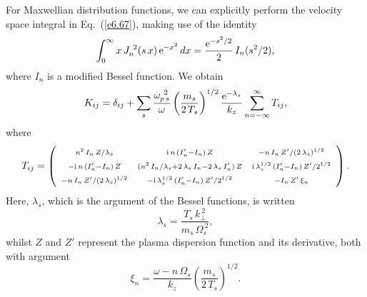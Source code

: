 For Maxwellian distribution functions, we can explicitly perform the velocity
space integral in Eq.~(\ref{e6.67}), making use of the identity
\begin{equation}
\int_0^\infty x\,J_n^{~2}(s\,x)\,{\rm e}^{-x^2}\,dx= \frac{{\rm e}^{-s^2/2}}{2}
\,I_n(s^2/2),
\end{equation}
where $I_n$ is a modified Bessel function. We obtain
\begin{equation}
K_{ij} = \delta_{ij} + \sum_s\frac{\omega_{p\,s}^{~2}}{\omega}
\left(\frac{m_s}{2\,T_s}\right)^{1/2} \frac{{\rm e}^{-\lambda_s}}{k_z}
\sum_{n=-\infty}^\infty T_{ij},
\end{equation}
where
\begin{equation}\label{e6.72}
T_{ij} = \left( \begin{array}{ccc}
{\scriptstyle n^2\,I_n\,Z/\lambda_s} & {\scriptstyle {\rm i}\,n\,(I_n'-I_n)\,Z} &
{\scriptstyle  -n\,I_n\,Z'/(2\,\lambda_s)^{1/2}}
\\[0.5ex]
{\scriptstyle -{\rm i}\,n\,(I_n'-I_n)\,Z} & {\scriptstyle (n^2\,I_n/\lambda_s +2\,\lambda_s\,I_n -2\,\lambda_s\,
I_n')\,Z} & {\scriptstyle {\rm i}\,\lambda_s^{1/2}\,(I_n'-I_n)\,Z'/2^{1/2}} \\[0.5ex]
{\scriptstyle -n\,I_n\,Z'/(2\,\lambda_s)^{1/2}} &{\scriptstyle
 -{\rm i}\,\lambda_s^{1/2}\,(I_n'-I_n)\,Z'/2^{1/2}}
&{\scriptstyle  -I_n\,Z'\,\xi_n}
\end{array}
\right).
\end{equation}
Here, $\lambda_s$, which is the argument of the Bessel functions, is written
\begin{equation}\label{e6.73}
\lambda_s = \frac{T_s\,k_\perp^{~2}}{m_s\,{\Omega}_s^{~2}},
\end{equation}
whilst $Z$ and $Z'$ represent the plasma dispersion function and its derivative,
both with argument
\begin{equation}\label{e6.74}
\xi_n = \frac{\omega - n\,{\Omega}_s}{k_z} \left(\frac{m_s}{2\,T_s}\right)^{1/2}.
\end{equation}

